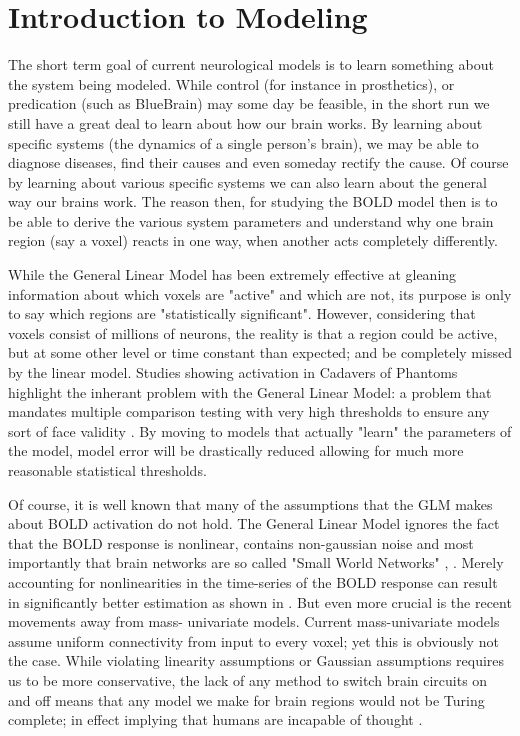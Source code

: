 \documentclass{article}
\begin{document}
\section*{Introduction to Modeling}
The short term goal of current neurological models is to
learn something about the system being modeled.
While control (for instance in prosthetics), or predication
(such as BlueBrain) may some day be feasible, in the
short run we still have a great deal to learn about how our
brain works. By learning about specific systems (the dynamics
of a single person's brain), we may be able to diagnose diseases,
find their causes and even someday rectify the cause. Of course
by learning about various specific systems we can also learn 
about the general way our brains work. The reason then, for 
studying the BOLD model then is
to be able to derive the various system parameters and understand
why one brain region (say a voxel) reacts in one way, when another
acts completely differently.

While the General Linear Model has been extremely effective at
gleaning information about which voxels are "active" and which
are not, its purpose is only to say which regions are "statistically
significant". However, considering that voxels consist of millions
of neurons, the reality is that a
region could be active, but at some other level or time constant
than expected; and be completely missed by the linear model. 
Studies showing activation
in Cadavers of Phantoms highlight the inherant problem with the 
General Linear Model: a problem that mandates multiple
comparison testing with very high thresholds to ensure any 
sort of face validity \citep{drift}.
By moving to models that actually "learn" the 
parameters of the model, model error will be drastically
reduced allowing for much more reasonable statistical thresholds.

Of course, it is well known that many of the assumptions 
that the GLM makes about BOLD activation do not hold. 
The General Linear Model ignores
the fact that the BOLD response is nonlinear, contains non-gaussian
noise and most importantly that brain networks are 
so called "Small World Networks" \citep{smallworld}, \citep{noise}. 
Merely accounting for
nonlinearities in the time-series of the BOLD response can
result in significantly better estimation as shown in \citep{nonlinearmodels}.
But even more crucial is the recent movements away from mass-
univariate models. Current mass-univariate models 
assume uniform connectivity from input to every voxel; yet
this is obviously not the case. While
violating linearity assumptions or Gaussian assumptions 
requires us to be more conservative, the lack of any method
to switch brain circuits on and off means that any model
we make for brain regions would not be Turing complete;
in effect implying that humans are incapable of 
thought \citep{turing}.
\end{document}
